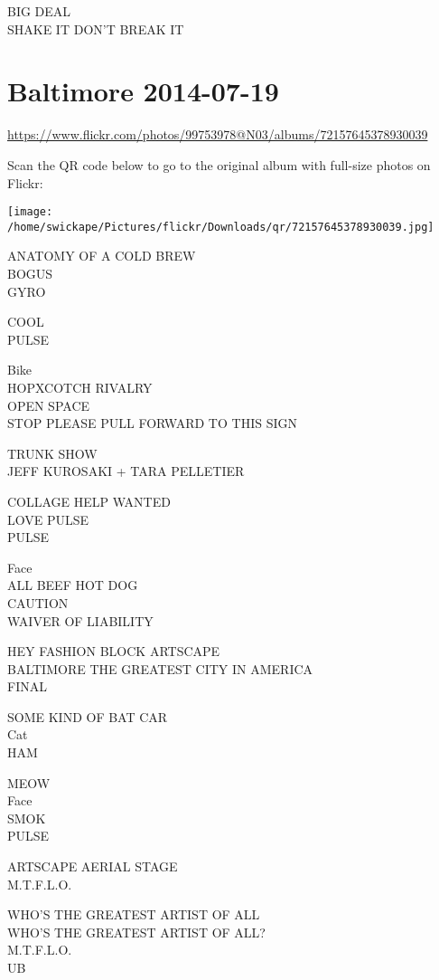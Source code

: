 \documentclass[10pt,letterpaper]{article}
\begin{document}
BIG DEAL\\
SHAKE IT DON'T BREAK IT


\section*{Baltimore 2014-07-19}

\url{https://www.flickr.com/photos/99753978@N03/albums/72157645378930039}

Scan the QR code below to go to the original album with full-size photos on Flickr:

\texttt{[image: /home/swickape/Pictures/flickr/Downloads/qr/72157645378930039.jpg]}


ANATOMY OF A COLD BREW\\
BOGUS\\
GYRO

COOL\\
PULSE

Bike\\
HOPXCOTCH RIVALRY\\
OPEN SPACE\\
STOP PLEASE PULL FORWARD TO THIS SIGN

TRUNK SHOW\\
JEFF KUROSAKI + TARA PELLETIER

COLLAGE HELP WANTED\\
LOVE PULSE\\
PULSE

Face\\
ALL BEEF HOT DOG\\
CAUTION\\
WAIVER OF LIABILITY

HEY FASHION BLOCK ARTSCAPE\\
BALTIMORE THE GREATEST CITY IN AMERICA\\
FINAL

SOME KIND OF BAT CAR\\
Cat\\
HAM

MEOW\\
Face\\
SMOK\\
PULSE

ARTSCAPE AERIAL STAGE\\
M.T.F.L.O.

WHO'S THE GREATEST ARTIST OF ALL\\
WHO'S THE GREATEST ARTIST OF ALL?\\
M.T.F.L.O.\\
UB
\end{document}
